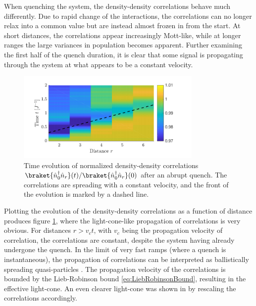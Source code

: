 When quenching the system, the density-density correlations behave much differently. Due to rapid change of the interactions, the correlations can no longer relax into a common value but are instead almost frozen in from the start. At short distances, the correlations appear increasingly Mott-like, while at longer ranges the large variances in population becomes apparent. Further examining the first half of the quench duration, it is clear that some signal is propagating through the system at what appears to be a constant velocity.
\begin{figure}[h!]
    \centering
    \includegraphics[width=0.8\textwidth]{Figures/L20/CorrelationLightCone.pdf}
    \caption{Time evolution of normalized density-density correlations $\braket{\hat{n}_{0}^{\dag} \hat{n}_{r}}(t) / \braket{\hat{n}_{0}^{\dag} \hat{n}_{r}}(0)$ after an abrupt quench. The correlations are spreading with a constant velocity, and the front of the evolution is marked by a dashed line.}
    \label{fig:CorrelationLightCone}
\end{figure}
Plotting the evolution of the density-density correlations as a function of distance produces figure \ref{fig:CorrelationLightCone}, where the light-cone-like propagation of correlations is very obvious. For distances $r >  v_c t$, with $v_c$ being the propagation velocity of correlation, the correlations are constant, despite the system having already undergone the quench. In the limit of very fast ramps (where a quench is instantaneous), the propagation of correlations can be interpreted as ballistically spreading quasi-particles \cite{Cheneau2012,Calabrese2006}. The propagation velocity of the correlations is bounded by the Lieb-Robinson bound \ref{eq:LiebRobinsonBound}, resulting in the effective light-cone. An even clearer light-cone was shown in \cite{Lauchli2008} by rescaling the correlations accordingly.\\

